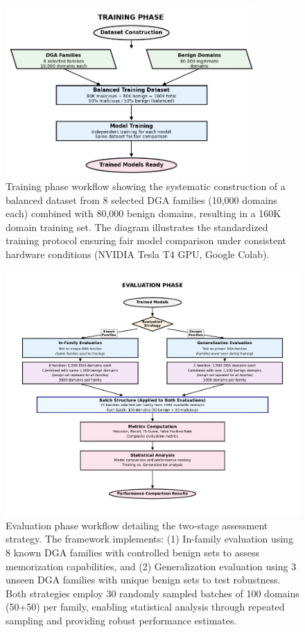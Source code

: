 \documentclass[a4paper]{llncs}
\begin{document}
\begin{figure}[ht]
    \centering
    \includegraphics[width=0.85\textwidth]{Train.jpg}
    \caption{Training phase workflow showing the systematic construction of a balanced dataset from 8 selected DGA families (10,000 domains each) combined with 80,000 benign domains, resulting in a 160K domain training set. The diagram illustrates the standardized training protocol ensuring fair model comparison under consistent hardware conditions (NVIDIA Tesla T4 GPU, Google Colab).}
    \label{fig:training_phase}
\end{figure}

\begin{figure}[ht]
    \centering
    \includegraphics[width=\textwidth]{evaluation_phase.pdf}
    \caption{Evaluation phase workflow detailing the two-stage assessment strategy. The framework implements: (1) In-family evaluation using 8 known DGA families with controlled benign sets to assess memorization capabilities, and (2) Generalization evaluation using 3 unseen DGA families with unique benign sets to test robustness. Both strategies employ 30 randomly sampled batches of 100 domains (50+50) per family, enabling statistical analysis through repeated sampling and providing robust performance estimates.}
    \label{fig:evaluation_phase}
\end{figure}
\end{document}
